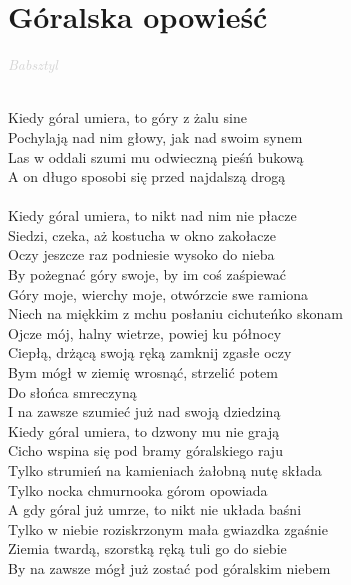 \documentclass[a5paper, 10pt]{book}
\begin{document}
\section{Góralska opowieść}\textcolor{lightgray}{\textit{Babsztyl}}\\~\\
\begin{minipage}[t]{0.8\textwidth}
Kiedy góral umiera, to góry z żalu sine\\
Pochylają nad nim głowy, jak nad swoim synem\\
Las w oddali szumi mu odwieczną pieśń bukową\\
A on długo sposobi się przed najdalszą drogą\\
\\
Kiedy góral umiera, to nikt nad nim nie płacze\\
Siedzi, czeka, aż kostucha w okno zakołacze\\
Oczy jeszcze raz podniesie wysoko do nieba\\
By pożegnać góry swoje, by im coś zaśpiewać\\

\hspace*{5mm}Góry moje, wierchy moje, otwórzcie swe ramiona\\
\hspace*{5mm}Niech na miękkim z mchu posłaniu cichuteńko skonam\\
\hspace*{5mm}Ojcze mój, halny wietrze, powiej ku północy\\
\hspace*{5mm}Ciepłą, drżącą swoją ręką zamknij zgasłe oczy\\
\hspace*{5mm}Bym mógł w ziemię wrosnąć, strzelić potem\\
\hspace*{5mm}Do słońca smreczyną\\
\hspace*{5mm}I na zawsze szumieć już nad swoją dziedziną\\

Kiedy góral umiera, to dzwony mu nie grają\\
Cicho wspina się pod bramy góralskiego raju\\
Tylko strumień na kamieniach żałobną nutę składa\\
Tylko nocka chmurnooka górom opowiada\\

A gdy góral już umrze, to nikt nie układa baśni\\
Tylko w niebie roziskrzonym mała gwiazdka zgaśnie\\
Ziemia twardą, szorstką ręką tuli go do siebie\\
By na zawsze mógł już zostać pod góralskim niebem\\
\end{minipage}
\end{document}
